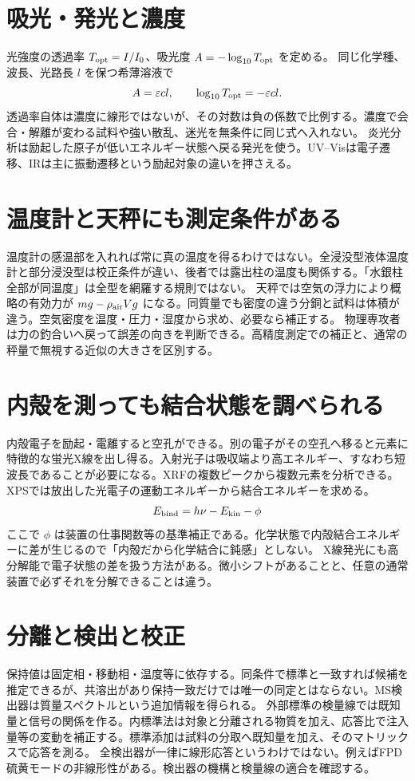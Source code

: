 \section{吸光・発光と濃度}\label{theory:analysis:beer}
光強度の透過率 \(T_{\rm opt}=I/I_0\)、吸光度 \(A=-\log_{10}T_{\rm opt}\) を定める。
同じ化学種、波長、光路長 \(l\) を保つ希薄溶液で
\[
 A=\varepsilon cl,\qquad \log_{10}T_{\rm opt}=-\varepsilon cl.
\]
透過率自体は濃度に線形ではないが、その対数は負の係数で比例する\cite{analysis49_beer_ref}。濃度で会合・解離が変わる試料や強い散乱、迷光を無条件に同じ式へ入れない。
炎光分析は励起した原子が低いエネルギー状態へ戻る発光を使う。UV--Visは電子遷移、IRは主に振動遷移という励起対象の違いを押さえる。

\section{温度計と天秤にも測定条件がある}\label{theory:analysis:metrology}
温度計の感温部を入れれば常に真の温度を得るわけではない。全浸没型液体温度計と部分浸没型は校正条件が違い、後者では露出柱の温度も関係する\cite{analysis49_thermo_ref}。「水銀柱全部が同温度」は全型を網羅する規則ではない。
天秤では空気の浮力により概略の有効力が \(mg-\rho_{\rm air}Vg\) になる。同質量でも密度の違う分銅と試料は体積が違う。空気密度を温度・圧力・湿度から求め、必要なら補正する\cite{analysis49_buoy_ref}。
物理専攻者は力の釣合いへ戻って誤差の向きを判断できる。高精度測定での補正と、通常の秤量で無視する近似の大きさを区別する。

\section{内殻を測っても結合状態を調べられる}\label{theory:analysis:xray}
内殻電子を励起・電離すると空孔ができる。別の電子がその空孔へ移ると元素に特徴的な蛍光X線を出し得る。入射光子は吸収端より高エネルギー、すなわち短波長であることが必要になる。XRFの複数ピークから複数元素を分析できる\cite{analysis49_xrf_ref}。
XPSでは放出した光電子の運動エネルギーから結合エネルギーを求める。
\[
 E_{\rm bind}=h\nu-E_{\rm kin}-\phi
\]
ここで \(\phi\) は装置の仕事関数等の基準補正である。化学状態で内殻結合エネルギーに差が生じるので「内殻だから化学結合に鈍感」としない\cite{analysis49_xps_ref}。
X線発光にも高分解能で電子状態の差を扱う方法がある\cite{analysis49_sxes_ref}。微小シフトがあることと、任意の通常装置で必ずそれを分解できることは違う。

\section{分離と検出と校正}\label{theory:analysis:chrom}
保持値は固定相・移動相・温度等に依存する。同条件で標準と一致すれば候補を推定できるが、共溶出があり保持一致だけでは唯一の同定とはならない。MS検出器は質量スペクトルという追加情報を得られる\cite{analysis49_library_ref}。
外部標準の検量線では既知量と信号の関係を作る。内標準法は対象と分離される物質を加え、応答比で注入量等の変動を補正する。標準添加は試料の分取へ既知量を加え、そのマトリックスで応答を測る\cite{analysis49_chrom_ref}。
全検出器が一律に線形応答というわけではない。例えばFPD硫黄モードの非線形性がある。検出器の機構と検量線の適合を確認する。

